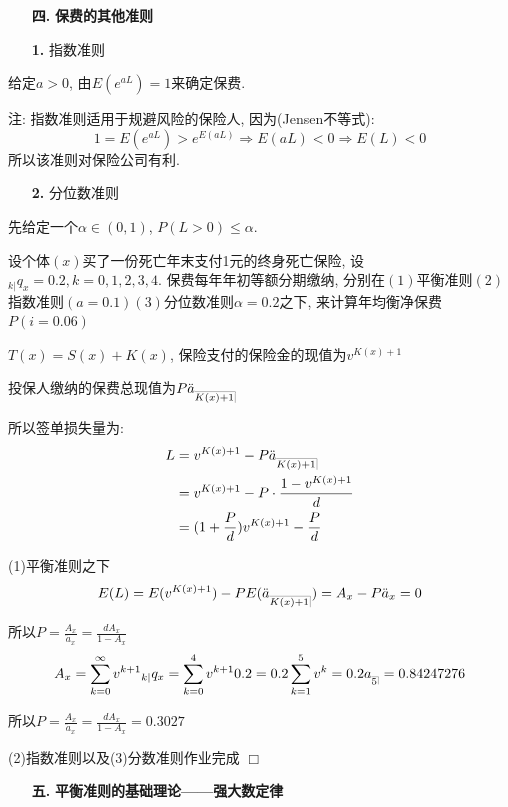 \documentclass[a4paper,10pt]{ctexbook}
\makeatletter
\newcommand{\hei}{\CJKfamily{hei}}      %
\def\qed{\hfill$\Box$\medskip}
\DeclareRobustCommand{\annu}[1]{_{%
    \def\arraystretch{0}%
    \setlength\arraycolsep{1pt}%
    \setlength\arrayrulewidth{.2pt}%
    \begin{array}[b]{@{}c|}\hline
        \\[\arraycolsep]%
        \scriptstyle #1%
    \end{array}%
}}
\makeatother
\begin{document}
\begin{itemize}
    \item[{\bf\hei 四.}]{\bf\hei 保费的其他准则}
\end{itemize}

\begin{itemize}
    \item[{\bf\hei 1.}] 指数准则
\end{itemize}

给定$a>0$, 由$E(e^{aL})=1$来确定保费.

注: 指数准则适用于规避风险的保险人, 因为(Jensen不等式):
$$1=E(e^{aL})>e^{E(aL)}\Rightarrow E(aL)<0\Rightarrow E(L)<0$$
所以该准则对保险公司有利.

\begin{itemize}
    \item[{\bf\hei2.}] 分位数准则
\end{itemize}

先给定一个$\alpha\in (0,1)$, $P(L>0)\leqslant\alpha$.

\begin{example}
    设个体$(x)$买了一份死亡年末支付1元的终身死亡保险, 设$_{k| }q_x=0.2,k=0,1,2,3,4$. 保费每年年初等额分期缴纳, 分别在$(1)$平衡准则$(2)$指数准则$(a=0.1)$$(3)$分位数准则$\alpha=0.2$之下, 来计算年均衡净保费$P(i=0.06)$
\end{example}
\solution $T(x)=S(x)+K(x)$, 保险支付的保险金的现值为$v^{K(x)+1}$

投保人缴纳的保费总现值为$P\ddot a_{\annu {K(x)+1}}$

所以签单损失量为:
\begin{align*}
    L & =v^{K(x)+1}-P\ddot a_{\annu {K(x)+1}}\\
    & =v^{K(x)+1}-P\cdot\frac{1-v^{K(x)+1}}{d} \\
      & =(1+\frac{P}{d})v^{K(x)+1}-\frac{P}{d}
\end{align*}

(1)平衡准则之下
$$E(L)=E(v^{K(x)+1})-PE(\ddot a_{\annu {K(x)+1}})=A_x-P\ddot a_{x}=0$$

所以$P=\frac{A_x}{\ddot a_{x}}=\frac{dA_x}{1-A_x}$
$$
    A_x  =\sum_{k=0}^{\infty }{v^{k+1}{}_{k|}q_x}=\sum_{k=0}^4{v^{k+1}0.2}=0.2\sum_{k=1}^{5}{v^k}=0.2a_{\annu 5}=0.84247276\\
$$

所以$P=\frac{A_x}{\ddot a_{x}}=\frac{dA_x}{1-A_x}=0.3027$

(2)指数准则以及(3)分数准则作业完成
\qed

\begin{itemize}
    \item[{\bf\hei 五.}]{\bf\hei 平衡准则的基础理论——强大数定律}
\end{itemize}
\end{document}
